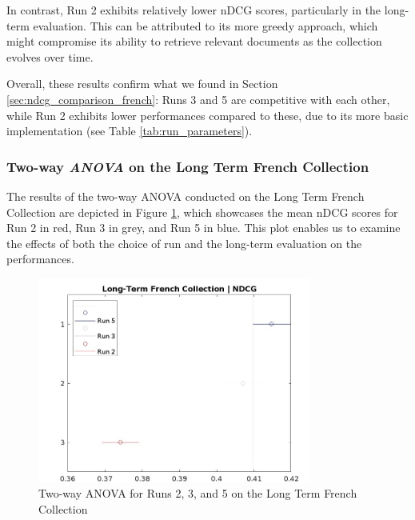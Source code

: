 In contrast, Run 2 exhibits relatively lower \ac{nDCG} scores, particularly in the long-term evaluation. This can be attributed to its more greedy approach, which might compromise its ability to retrieve relevant documents as the collection evolves over time.

Overall, these results confirm what we found in Section \ref{sec:ndcg_comparison_french}: Runs 3 and 5 are competitive with each other, while Run 2 exhibits lower performances compared to these, due to its more basic implementation (see Table \ref{tab:run_parameters}). 


\subsubsection{Two-way \textit{ANOVA} on the Long Term French Collection} \label{sec:anova_fr_lt}

The results of the two-way \ac{ANOVA} conducted on the Long Term French Collection are depicted in Figure \ref{fig:lt_anova_french}, which showcases the mean \ac{nDCG} scores for Run 2 in red, Run 3 in grey, and Run 5 in blue. 
This plot enables us to examine the effects of both the choice of run and the long-term evaluation on the performances.

\begin{figure}[!h]
\centering
\includegraphics[width=0.8\textwidth]{figure/StatisticalAnalysis/ANOVA 2/ndcg-lt-fr.jpeg}
\caption{Two-way \ac{ANOVA} for Runs 2, 3, and 5 on the Long Term French Collection}
\label{fig:lt_anova_french}
\end{figure}


